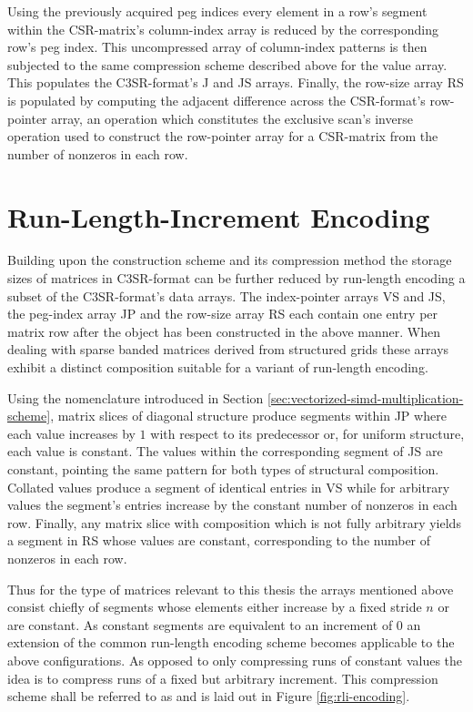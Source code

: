     Using the previously acquired peg indices every element in a row's segment within the CSR-matrix's column-index
    array is reduced by the corresponding row's peg index. This uncompressed array of column-index patterns is then
    subjected to the same compression scheme described above for the value array. This populates the C3SR-format's J and
    JS arrays. Finally, the row-size array RS is populated by computing the adjacent difference across the CSR-format's
    row-pointer array, an operation which constitutes the exclusive scan's inverse operation used to construct the
    row-pointer array for a CSR-matrix from the number of nonzeros in each row.

  \section{Run-Length-Increment Encoding}

    Building upon the construction scheme and its compression method the storage sizes of matrices in C3SR-format can be
    further reduced by run-length encoding a subset of the C3SR-format's data arrays. The index-pointer arrays VS and
    JS, the peg-index array JP and the row-size array RS each contain one entry per matrix row after the object has been
    constructed in the above manner. When dealing with sparse banded matrices derived from structured grids these arrays
    exhibit a distinct composition suitable for a variant of run-length encoding.

    Using the nomenclature introduced in Section \ref{sec:vectorized-simd-multiplication-scheme}, matrix slices of
    diagonal structure produce segments within JP where each value increases by $1$ with respect to its predecessor or,
    for uniform structure, each value is constant. The values within the corresponding segment of JS are constant,
    pointing the same pattern for both types of structural composition. Collated values produce a segment of identical
    entries in VS while for arbitrary values the segment's entries increase by the constant number of nonzeros in each
    row. Finally, any matrix slice with composition which is not fully arbitrary yields a segment in RS whose values are
    constant, corresponding to the number of nonzeros in each row.

    Thus for the type of matrices relevant to this thesis the arrays mentioned above consist chiefly of segments whose
    elements either increase by a fixed stride $n$ or are constant. As constant segments are equivalent to an increment
    of $0$ an extension of the common run-length encoding scheme becomes applicable to the above configurations. As opposed to
    only compressing runs of constant values the idea is to compress runs of a fixed but arbitrary increment. This
    compression scheme shall be referred to as  and is laid out in Figure
    \ref{fig:rli-encoding}.

